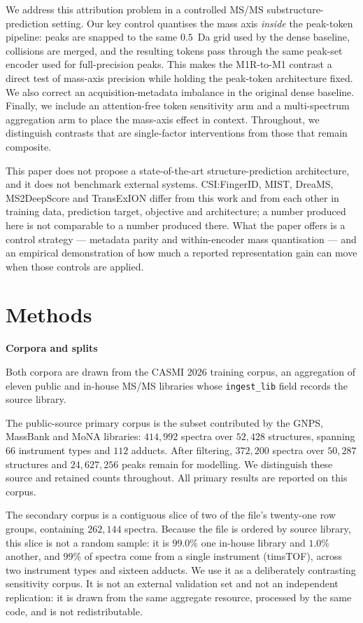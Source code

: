 \documentclass[11pt]{article}
\newcommand{\hd}[1]{\medskip\par\noindent\textbf{#1}\par\nobreak\vspace{2pt}\noindent\ignorespaces}
\begin{document}
We address this attribution problem in a controlled MS/MS substructure-prediction setting. Our key control quantises the mass axis \emph{inside} the peak-token pipeline: peaks are snapped to the same $0.5$~Da grid used by the dense baseline, collisions are merged, and the resulting tokens pass through the same peak-set encoder used for full-precision peaks. This makes the M1R-to-M1 contrast a direct test of mass-axis precision while holding the peak-token architecture fixed. We also correct an acquisition-metadata imbalance in the original dense baseline. Finally, we include an attention-free token sensitivity arm and a multi-spectrum aggregation arm to place the mass-axis effect in context. Throughout, we distinguish contrasts that are single-factor interventions from those that remain composite.

This paper does not propose a state-of-the-art structure-prediction architecture, and it does not benchmark external systems. CSI:FingerID, MIST, DreaMS, MS2DeepScore and TransExION differ from this work and from each other in training data, prediction target, objective and architecture; a number produced here is not comparable to a number produced there. What the paper offers is a control strategy --- metadata parity and within-encoder mass quantisation --- and an empirical demonstration of how much a reported representation gain can move when those controls are applied.

\section*{Methods}
\hd{Corpora and splits}
Both corpora are drawn from the CASMI 2026 training corpus, an aggregation of eleven public and in-house MS/MS libraries whose \texttt{ingest\_lib} field records the source library.

The public-source primary corpus is the subset contributed by the GNPS, MassBank and MoNA libraries: $414{,}992$ spectra over $52{,}428$ structures, spanning $66$ instrument types and $112$ adducts. After filtering, $372{,}200$ spectra over $50{,}287$ structures and $24{,}627{,}256$ peaks remain for modelling. We distinguish these source and retained counts throughout. All primary results are reported on this corpus.

The secondary corpus is a contiguous slice of two of the file's twenty-one row groups, containing $262{,}144$ spectra. Because the file is ordered by source library, this slice is not a random sample: it is $99.0\%$ one in-house library and $1.0\%$ another, and $99\%$ of spectra come from a single instrument (timsTOF), across two instrument types and sixteen adducts. We use it as a deliberately contrasting sensitivity corpus. It is not an external validation set and not an independent replication: it is drawn from the same aggregate resource, processed by the same code, and is not redistributable.
\end{document}
